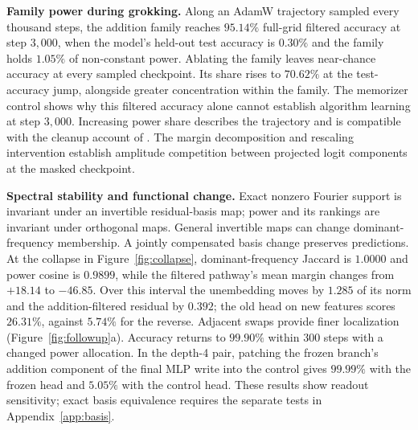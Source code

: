 \textbf{Family power during grokking.} Along an AdamW trajectory sampled every thousand steps, the addition family reaches $95.14\%$ full-grid filtered accuracy at step $3{,}000$, when the model's held-out test accuracy is $0.30\%$ and the family holds $1.05\%$ of non-constant power. Ablating the family leaves near-chance accuracy at every sampled checkpoint. Its share rises to $70.62\%$ at the test-accuracy jump, alongside greater concentration within the family. The memorizer control shows why this filtered accuracy alone cannot establish algorithm learning at step $3{,}000$. Increasing power share describes the trajectory and is compatible with the cleanup account of \citet{nanda2023progress}. The margin decomposition and rescaling intervention establish amplitude competition between projected logit components at the masked checkpoint.

\textbf{Spectral stability and functional change.} Exact nonzero Fourier support is invariant under an invertible residual-basis map; power and its rankings are invariant under orthogonal maps. General invertible maps can change dominant-frequency membership. A jointly compensated basis change preserves predictions. At the collapse in Figure~\ref{fig:collapse}, dominant-frequency Jaccard is $1.0000$ and power cosine is $0.9899$, while the filtered pathway's mean margin changes from $+18.14$ to $-46.85$. Over this interval the unembedding moves by $1.285$ of its norm and the addition-filtered residual by $0.392$; the old head on new features scores $26.31\%$, against $5.74\%$ for the reverse. Adjacent swaps provide finer localization (Figure~\ref{fig:followup}a). Accuracy returns to $99.90\%$ within $300$ steps with a changed power allocation. In the depth-4 pair, patching the frozen branch's addition component of the final MLP write into the control gives $99.99\%$ with the frozen head and $5.05\%$ with the control head. These results show readout sensitivity; exact basis equivalence requires the separate tests in Appendix~\ref{app:basis}.

